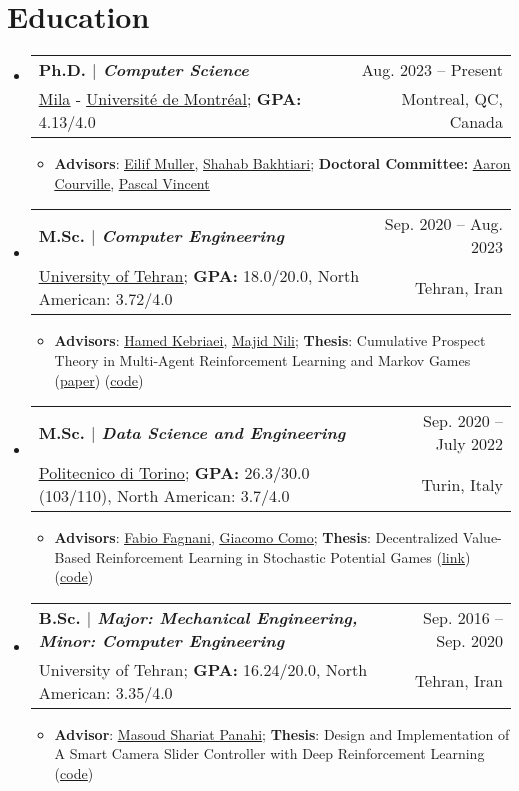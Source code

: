 \documentclass[A4,11pt]{article}
\makeatletter
\newcommand{\CVItem}[1]{
  \item\small{
    {#1 \vspace{-2pt}}
  }
}
\newcommand{\CVSubheading}[4]{
  \vspace{-2pt}\item
    \begin{tabular*}{0.97\textwidth}[t]{l@{\extracolsep{\fill}}r}
      \textbf{#1} & #2 \\
      \small#3 & \small #4 \\
    \end{tabular*}\vspace{-7pt}
}
\newcommand{\CVSubHeadingListStart}{\begin{itemize}[leftmargin=0.5cm, label={}]}
\newcommand{\CVSubHeadingListEnd}{\end{itemize}}
\newcommand{\CVItemListStart}{\begin{itemize}}
\newcommand{\CVItemListEnd}{\end{itemize}\vspace{-5pt}}
\makeatother
\begin{document}
\section{Education}
  \CVSubHeadingListStart
    \CVSubheading
      {{Ph.D. $|$ \emph{Computer Science}}}{Aug. 2023 -- Present}
      {\href{https://mila.quebec/en/}{\underline{Mila}} - \href{https://diro.umontreal.ca/english/home/}{\underline{Université de Montréal}}; \textbf{GPA:} 4.13/4.0}{Montreal, QC, Canada}
      \CVItemListStart
        \CVItem{\textbf{Advisors}: \href{https://scholar.google.ch/citations?user=r4-NZhwAAAAJ&hl=en}{\underline{Eilif Muller}},
        \href{https://scholar.google.com/citations?user=f_JDOhEAAAAJ&hl=en}{\underline{Shahab Bakhtiari}}; \textbf{Doctoral Committee:} \href{https://scholar.google.com/citations?hl=en&user=km6CP8cAAAAJ&view_op=list_works}{\underline{Aaron Courville}},
        \href{https://scholar.google.com/citations?hl=en&user=WBCKQMsAAAAJ&view_op=list_works}{\underline{Pascal Vincent}}}
      \CVItemListEnd
    \CVSubheading
      {{M.Sc. $|$ \emph{Computer Engineering}}}{Sep. 2020 -- Aug. 2023}
      {\href{https://ut.ac.ir/en}{\underline{University of Tehran}}; \textbf{GPA:} 18.0/20.0, North American: 3.72/4.0}{Tehran, Iran}
      \CVItemListStart
        \CVItem{\textbf{Advisors}: \href{https://scholar.google.com/citations?user=eDseLNYAAAAJ&hl=en}{\underline{Hamed Kebriaei}},
        \href{https://scholar.google.com/citations?user=QlwWxmoAAAAJ&hl=en}{\underline{Majid Nili}}; \textbf{Thesis}: Cumulative Prospect Theory in Multi-Agent Reinforcement Learning and Markov Games
        	(\href{https://arxiv.org/abs/2402.05906}{\underline{paper}}) (\href{https://github.com/hafezgh/risk-sensitive-marl-namg}{\underline{code}})}
      \CVItemListEnd
    \CVSubheading
      {{M.Sc. $|$ \emph{\small{Data Science and Engineering}}}}{Sep. 2020 -- July 2022}
      {\href{https://www.polito.it/en?lang=en}{\underline{Politecnico di Torino}}; \textbf{GPA:} 26.3/30.0 (103/110), North American: 3.7/4.0}{Turin, Italy}
      \CVItemListStart
        \CVItem{\textbf{Advisors}: \href{https://scholar.google.com/citations?user=oqwlDQEAAAAJ&hl=en}{\underline{Fabio Fagnani}},
        \href{https://scholar.google.com/citations?user=7dju3QoAAAAJ&hl=en}{\underline{Giacomo Como}}; \textbf{Thesis}: Decentralized Value-Based Reinforcement Learning in Stochastic Potential Games (\href{https://webthesis.biblio.polito.it/23450/}{\underline{link}}) (\href{https://github.com/hafezgh/PoliTo-MSc-Thesis}{\underline{code}})}
      \CVItemListEnd
    \CVSubheading
      {{B.Sc. $|$ \emph{\small{Major: Mechanical Engineering, Minor: Computer Engineering}}}}{Sep. 2016 -- Sep. 2020}
      {{University of Tehran}; \textbf{GPA:} 16.24/20.0, North American: 3.35/4.0}{Tehran, Iran}
    \CVItemListStart
        \CVItem{\textbf{Advisor}: \href{https://scholar.google.com/citations?user=UwlyBw0AAAAJ&hl=en}{\underline{Masoud Shariat Panahi}}; \textbf{Thesis}: Design and Implementation of A Smart Camera Slider Controller with Deep Reinforcement Learning (\href{https://github.com/hafezgh/bahcelor_thesis}{\underline{code}})}
    \CVItemListEnd
  \CVSubHeadingListEnd
\end{document}
